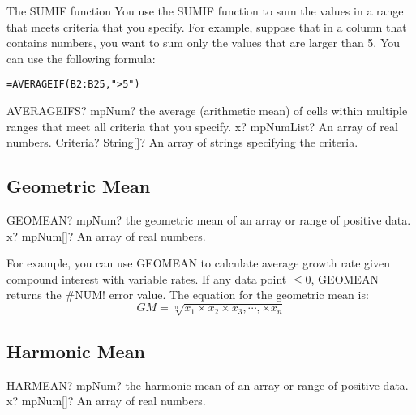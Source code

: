 \vspace{0.3cm}
The \textsf{SUMIF} function   You use the SUMIF function to sum the values in a range  that meets criteria that you specify. For example, suppose that in a column that contains numbers, you want to sum only the values that are larger than 5. You can use the following formula:

\begin{verbatim}
=AVERAGEIF(B2:B25,">5")
\end{verbatim}


\vspace{0.3cm}
\begin{mpFunctionsExtract}
	\mpWorksheetFunctionTwoNotImplemented
	{AVERAGEIFS? mpNum? the average (arithmetic mean) of cells within multiple ranges that meet all criteria that you specify.}
	{x? mpNumList? An array of real numbers.}
	{Criteria? String[]? An array of strings specifying the criteria.}
\end{mpFunctionsExtract}




\subsection{Geometric Mean}

\begin{mpFunctionsExtract}
	\mpWorksheetFunctionOneNotImplemented
	{GEOMEAN? mpNum? the geometric mean of an array or range of positive data.}
	{x? mpNum[]? An array of real numbers.}
\end{mpFunctionsExtract}

\vspace{0.3cm}
For example, you can use GEOMEAN to calculate average growth rate given compound interest with variable rates.
If any data point $\leq 0$, GEOMEAN returns the \#NUM! error value. 
The equation for the geometric mean is:
\begin{equation}
	GM=\sqrt[n]{x_1 \times x_2 \times x_3, \cdots, \times x_n}
\end{equation}



\subsection{Harmonic Mean}

\begin{mpFunctionsExtract}
	\mpWorksheetFunctionOneNotImplemented
	{HARMEAN? mpNum? the harmonic mean of an array or range of positive data.}
	{x? mpNum[]? An array of real numbers.}
\end{mpFunctionsExtract}

